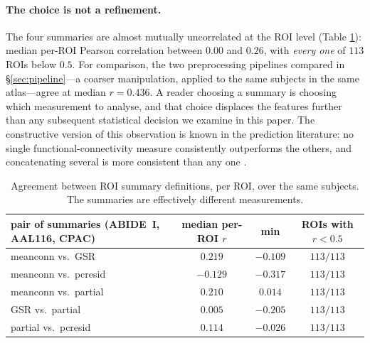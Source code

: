 \documentclass[11pt,a4paper]{article}
\begin{document}
\paragraph{The choice is not a refinement.}
The four summaries are almost mutually uncorrelated at the ROI level
(Table \ref{tab:agree}): median per-ROI Pearson correlation between $0.00$
and $0.26$, with \emph{every one} of $113$ ROIs below $0.5$. For comparison,
the two preprocessing pipelines compared in \S\ref{sec:pipeline}---a
coarser manipulation, applied to the same subjects in the same
atlas---agree at median $r=0.436$. A reader choosing a summary is choosing
which measurement to analyse, and that choice displaces the features further
than any subsequent statistical decision we examine in this paper. The
constructive version of this observation is known in the prediction
literature: no single functional-connectivity measure consistently
outperforms the others, and concatenating several is more consistent than
any one \citep{mohanty2020rethinking}.

\begin{table}[htbp]
\centering
{\small\setlength{\tabcolsep}{6pt}
\begin{tabular}{lccc}
\toprule
pair of summaries (ABIDE~I, AAL116, CPAC) & median per-ROI $r$ & min & ROIs with $r<0.5$ \\
\midrule
meanconn vs.\ GSR       & $0.219$ & $-0.109$ & $113/113$ \\
meanconn vs.\ pcresid   & $-0.129$& $-0.317$ & $113/113$ \\
meanconn vs.\ partial   & $0.210$ & $0.014$  & $113/113$ \\
GSR vs.\ partial        & $0.005$ & $-0.205$ & $113/113$ \\
partial vs.\ pcresid    & $0.114$ & $-0.026$ & $113/113$ \\
\bottomrule
\end{tabular}}
\caption{Agreement between ROI summary definitions, per ROI, over the same
subjects. The summaries are effectively different measurements.}
\label{tab:agree}
\end{table}
\end{document}
